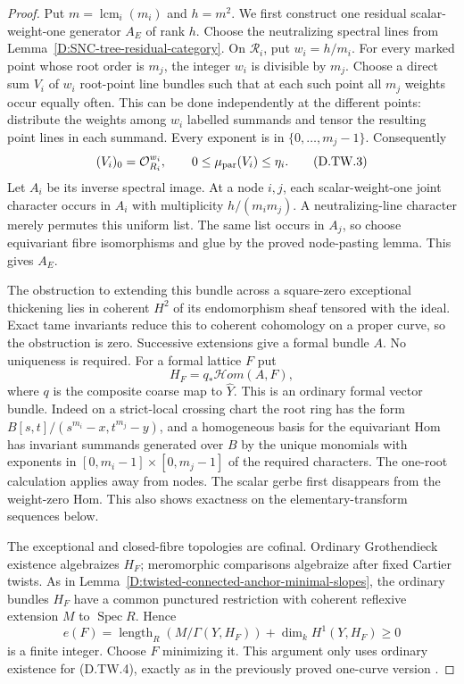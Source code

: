 \begin{proof}
Put $m=\operatorname{lcm}_i(m_i)$ and $h=m^2$.
We first construct one residual scalar-weight-one generator
$A_E$ of rank $h$. Choose the neutralizing spectral lines
from Lemma~\ref{D:SNC-tree-residual-category}. On
$\mathcal R_i$, put $w_i=h/m_i$. For every marked point
whose root order is $m_j$, the integer $w_i$ is divisible
by $m_j$. Choose a direct sum $V_i$ of $w_i$ root-point
line bundles such that at each such point all $m_j$
weights occur equally often. This can be done independently
at the different points: distribute the weights among
$w_i$ labelled summands and tensor the resulting point
lines in each summand. Every exponent is in
$\{0,\ldots,m_j-1\}$. Consequently
\[
 (V_i)_0=\mathcal O_{R_i}^{w_i},\qquad
                 0\leq\mu_{\rm par}(V_i)\leq\eta_i.
                                                        \tag{D.TW.3}
\]
Let $A_i$ be its inverse spectral image. At a node $i,j$,
each scalar-weight-one joint character occurs in $A_i$
with multiplicity $h/(m_i m_j)$. A neutralizing-line
character merely permutes this uniform list. The same
list occurs in $A_j$, so choose equivariant fibre
isomorphisms and glue by the proved node-pasting lemma.
This gives $A_E$.

The obstruction to extending this bundle across a
square-zero exceptional thickening lies in coherent
$H^2$ of its endomorphism sheaf tensored with the ideal.
Exact tame invariants reduce this to coherent cohomology
on a proper curve, so the obstruction is zero. Successive
extensions give a formal bundle $A$. No uniqueness is
required. For a formal lattice $F$ put
\[
                         H_F=q_*\mathcal Hom(A,F),
                                                        \tag{D.TW.4}
\]
where $q$ is the composite coarse map to $\widehat Y$.
This is an ordinary formal vector bundle. Indeed on a
strict-local crossing chart the root ring has the form
$B[s,t]/(s^{m_i}-x,t^{m_j}-y)$, and a homogeneous basis
for the equivariant Hom has invariant summands generated
over $B$ by the unique monomials with exponents in
$[0,m_i-1]\times[0,m_j-1]$ of the required characters.
The one-root calculation applies away from nodes. The
scalar gerbe first disappears from the weight-zero Hom.
This also shows exactness on the elementary-transform
sequences below.

The exceptional and closed-fibre topologies are cofinal.
Ordinary Grothendieck existence algebraizes $H_F$;
meromorphic comparisons algebraize after fixed Cartier
twists. As in Lemma~\ref{D:twisted-connected-anchor-minimal-slopes},
the ordinary bundles $H_F$ have a common punctured
restriction with coherent reflexive extension $M$ to
$\operatorname{Spec}R$. Hence
\[
 e(F)=\operatorname{length}_R(M/\Gamma(Y,H_F))
                              +\dim_k H^1(Y,H_F)\geq0
                                                        \tag{D.TW.5}
\]
is a finite integer. Choose $F$ minimizing it. This
argument only uses ordinary existence for (D.TW.4),
exactly as in the previously proved one-curve version
\citep[Theorem30.27.1, Tag088E]{StacksTwistedDepthD}.


\end{proof}
